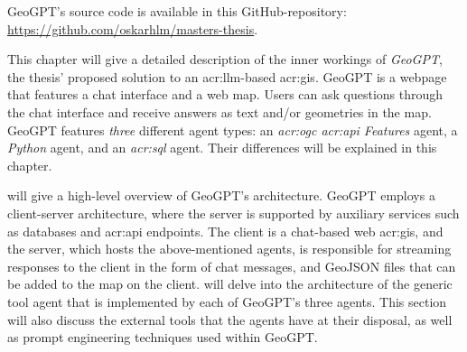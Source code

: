 \begin{comment}
\textit{Phasellus sed ipsum nunc. Nam iaculis felis mauris, sit amet condimentum ex malesuada at. Morbi lacinia odio mi, sit amet pellentesque ante facilisis sit amet. In lobortis elit ut dictum mollis. Aliquam erat volutpat. Morbi sit amet metus nisi. Nulla auctor varius metus at rhoncus. Pellentesque porta mollis leo, eu ultricies nulla mollis ac. Vivamus interdum ac odio vitae sodales. Aenean finibus eros rhoncus molestie elementum. Integer maximus erat vitae purus lobortis iaculis. Etiam blandit varius nulla, sed euismod felis.}

Clearly, a figure showing the architecture is a must, such as Figure~\ref{fig:Architecture}.
Describe all parts of such a figure in reasonable detail in the text, possibly with forward pointers to sections where they will be elaborated on (or backward pointers to sections where tools and methods already have been introduced).
Mention work that motivated your architectural choices, parameter settings, etc.
Those choices should then also be discussed and elaborated on in the Discussion chapter.

\begin{figure}[t!]
    \centering
    \missingfigure{Architecture figure to be added}
    \caption{The missing architecture}
    \label{fig:Architecture}
\end{figure}
\end{comment}

\begin{itshape}
    GeoGPT's source code is available in this GitHub-repository: \url{https://github.com/oskarhlm/masters-thesis}.
\end{itshape}

\vspace{12pt}

This chapter will give a detailed description of the inner workings of \textit{GeoGPT}, the thesis' proposed solution to an \acrshort{acr:llm}-based \acrshort{acr:gis}. GeoGPT is a webpage that features a chat interface and a web map. Users can ask questions through the chat interface and receive answers as text and/or geometries in the map. GeoGPT features \textit{three} different agent types: an \textit{\acrshort{acr:ogc} \acrshort{acr:api} Features} agent, a \textit{Python} agent, and an \textit{\acrshort{acr:sql}} agent. Their differences will be explained in this chapter.

 will give a high-level overview of GeoGPT's architecture. GeoGPT employs a client-server architecture, where the server is supported by auxiliary services such as databases and \acrshort{acr:api} endpoints. The client is a chat-based web \acrshort{acr:gis}, and the server, which hosts the above-mentioned agents, is responsible for streaming responses to the client in the form of chat messages, and GeoJSON files that can be added to the map on the client.  will delve into the architecture of the generic tool agent that is implemented by each of GeoGPT's three agents. This section will also discuss the external tools that the agents have at their disposal, as well as prompt engineering techniques used within GeoGPT.

